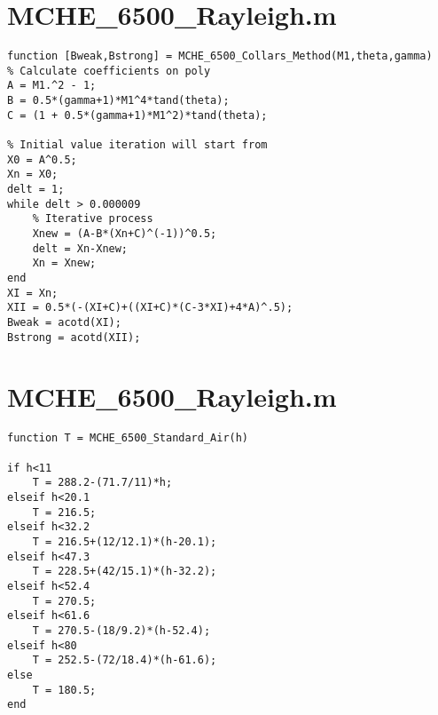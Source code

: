 \documentclass{article}
\begin{document}
\section*{MCHE\_6500\_Rayleigh.m}
\begin{lstlisting}[style=Matlab-editor]
function [Bweak,Bstrong] = MCHE_6500_Collars_Method(M1,theta,gamma)
% Calculate coefficients on poly
A = M1.^2 - 1;
B = 0.5*(gamma+1)*M1^4*tand(theta);
C = (1 + 0.5*(gamma+1)*M1^2)*tand(theta);

% Initial value iteration will start from
X0 = A^0.5;
Xn = X0;
delt = 1;
while delt > 0.000009
    % Iterative process
    Xnew = (A-B*(Xn+C)^(-1))^0.5;
    delt = Xn-Xnew;
    Xn = Xnew;
end
XI = Xn;
XII = 0.5*(-(XI+C)+((XI+C)*(C-3*XI)+4*A)^.5);
Bweak = acotd(XI);
Bstrong = acotd(XII);
\end{lstlisting}

\section*{MCHE\_6500\_Rayleigh.m}
\begin{lstlisting}[style=Matlab-editor]
function T = MCHE_6500_Standard_Air(h)

if h<11
    T = 288.2-(71.7/11)*h;
elseif h<20.1
    T = 216.5;
elseif h<32.2
    T = 216.5+(12/12.1)*(h-20.1);
elseif h<47.3
    T = 228.5+(42/15.1)*(h-32.2);
elseif h<52.4
    T = 270.5;
elseif h<61.6
    T = 270.5-(18/9.2)*(h-52.4);
elseif h<80
    T = 252.5-(72/18.4)*(h-61.6);
else
    T = 180.5;
end

    
\end{lstlisting}
\end{document}
